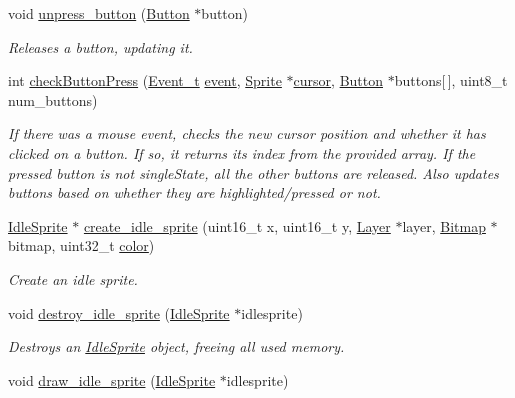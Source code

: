 \begin{DoxyCompactItemize}
void \mbox{\hyperlink{group__sprite_gae98d092189bc279e8a79ce65a4d7f436}{unpress\+\_\+button}} (\mbox{\hyperlink{struct_button}{Button}} $\ast$button)
\begin{DoxyCompactList}\small\item\em Releases a button, updating it. \end{DoxyCompactList}\item 
int \mbox{\hyperlink{group__sprite_ga34874b7023163a28e2d314d7ab833da1}{check\+Button\+Press}} (\mbox{\hyperlink{struct_event__t}{Event\+\_\+t}} \mbox{\hyperlink{pengoo_8c_af662780d461acf9ac3b1321884e7cb01}{event}}, \mbox{\hyperlink{struct_sprite}{Sprite}} $\ast$\mbox{\hyperlink{pengoo_8c_a3a7ea4305773abf5347bb261a8a5c16b}{cursor}}, \mbox{\hyperlink{struct_button}{Button}} $\ast$buttons\mbox{[}$\,$\mbox{]}, uint8\+\_\+t num\+\_\+buttons)
\begin{DoxyCompactList}\small\item\em If there was a mouse event, checks the new cursor position and whether it has clicked on a button. If so, it returns its index from the provided array. If the pressed button is not single\+State, all the other buttons are released. Also updates buttons based on whether they are highlighted/pressed or not. \end{DoxyCompactList}\item 
\mbox{\hyperlink{struct_idle_sprite}{Idle\+Sprite}} $\ast$ \mbox{\hyperlink{group__sprite_ga802ed6ffe723a0df6e97ab0dd5006e0f}{create\+\_\+idle\+\_\+sprite}} (uint16\+\_\+t x, uint16\+\_\+t y, \mbox{\hyperlink{struct_layer}{Layer}} $\ast$layer, \mbox{\hyperlink{struct_bitmap}{Bitmap}} $\ast$bitmap, uint32\+\_\+t \mbox{\hyperlink{structcolor}{color}})
\begin{DoxyCompactList}\small\item\em Create an idle sprite. \end{DoxyCompactList}\item 
void \mbox{\hyperlink{group__sprite_ga61aab38a0e3013985ea15998cc898846}{destroy\+\_\+idle\+\_\+sprite}} (\mbox{\hyperlink{struct_idle_sprite}{Idle\+Sprite}} $\ast$idlesprite)
\begin{DoxyCompactList}\small\item\em Destroys an \mbox{\hyperlink{struct_idle_sprite}{Idle\+Sprite}} object, freeing all used memory. \end{DoxyCompactList}\item 
void \mbox{\hyperlink{group__sprite_gaeee668e211c134def251f737269b9d5e}{draw\+\_\+idle\+\_\+sprite}} (\mbox{\hyperlink{struct_idle_sprite}{Idle\+Sprite}} $\ast$idlesprite)

\end{DoxyCompactItemize}
